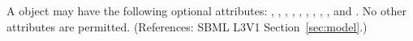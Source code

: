 A \Model object may have the following optional attributes:
, , , ,
, , ,
, ,  and
.  No other attributes are permitted.  
(References: SBML L3V1 Section~\ref{sec:model}.)
